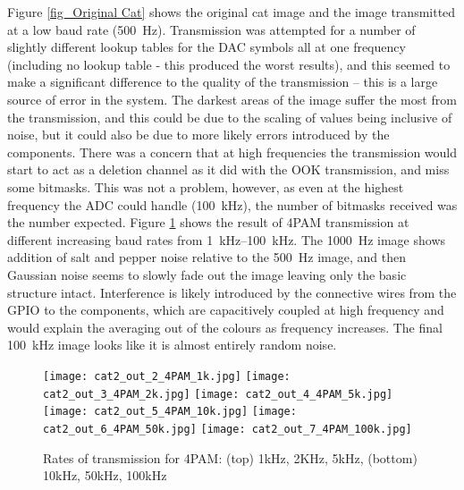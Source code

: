 \documentclass[../main.tex]{subfiles}
\begin{document}
Figure \ref{fig_Original Cat} shows the original cat image and the image transmitted at a low baud rate (\SI{500}{\hertz}).
Transmission was attempted for a number of slightly different lookup tables for the DAC symbols all at one frequency (including no lookup table - this produced the worst results), and this seemed to make a significant difference to the quality of the transmission -- this is a large source of error in the system.
The darkest areas of the image suffer the most from the transmission, and this could be due to the scaling of values being inclusive of noise, but it could also be due to more likely errors introduced by the components.
There was a concern that at high frequencies the transmission would start to act as a deletion channel as it did with the OOK transmission, and miss some bitmasks.
This was not a problem, however, as even at the highest frequency the ADC could handle (\SI{100}{\kilo\hertz}), the number of bitmasks received was the number expected.
Figure \ref{fig_4PAM Cats} shows the result of 4PAM transmission at different increasing baud rates from \SIrange{1}{100}{\kilo\hertz}.
The \SI{1000}{\hertz} image shows addition of salt and pepper noise relative to the \SI{500}{\hertz} image, and then Gaussian noise seems to slowly fade out the image leaving only the basic structure intact.
Interference is likely introduced by the connective wires from the GPIO to the components, which are capacitively coupled at high frequency and would explain the averaging out of the colours as frequency increases.
The final \SI{100}{\kilo\hertz} image looks like it is almost entirely random noise.

\begin{figure}[ht]
	\centering
	
	\texttt{[image: cat2\_out\_2\_4PAM\_1k.jpg]}
	\texttt{[image: cat2\_out\_3\_4PAM\_2k.jpg]}
	\texttt{[image: cat2\_out\_4\_4PAM\_5k.jpg]}\\[1mm]
	\texttt{[image: cat2\_out\_5\_4PAM\_10k.jpg]}
	\texttt{[image: cat2\_out\_6\_4PAM\_50k.jpg]}
	\texttt{[image: cat2\_out\_7\_4PAM\_100k.jpg]}
	
	\caption{Rates of transmission for 4PAM: (top) 1kHz, 2KHz, 5kHz, (bottom) 10kHz, 50kHz, 100kHz}
	\label{fig_4PAM Cats}
\end{figure}
\end{document}

